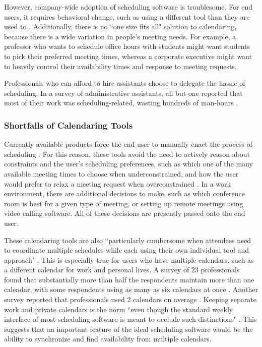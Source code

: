\documentclass{article}
\begin{document}
However, company-wide adoption of scheduling software is troublesome. For end users, it requires behavioral change, such as using a different tool than they are used to \cite{ehrlich_strategies_1987}. Additionally, there is no ``one size fits all" solution to calendaring, because there is a wide variation in people's meeting needs. For example, a professor who wants to schedule office hours with students might want students to pick their preferred meeting times, whereas a corporate executive might want to heavily control their availability times and response to meeting requests.

Professionals who can afford to hire assistants choose to delegate the hassle of scheduling. In a survey of administrative assistants, all but one reported that most of their work was scheduling-related, wasting hundreds of man-hours \cite{erickson_assistance:_2008}.

\subsubsection{Shortfalls of Calendaring Tools}

Currently available products force the end user to manually enact the process of scheduling \cite{jennings_agent-based_1995}. For this reason, these tools avoid the need to actively reason about constraints and the user's scheduling preferences, such as which one of the many available meeting times to choose when underconstrained, and how the user would prefer to relax a meeting request when overconstrained \cite{berry_ptime:_2011}. In a work environment, there are additional decisions to make, such as which conference room is best for a given type of meeting, or setting up remote meetings using video calling software. All of these decisions are presently passed onto the end user.

These calendaring tools are also ``particularly cumbersome when attendees need to coordinate multiple schedules while each using their own individual tool and approach" \cite{cranshaw_calendar.help:_2017}. This is especially true for users who have multiple calendars, such as a different calendar for work and personal lives. A survey of 23 professionals found that substantially more than half the respondents maintain more than one calendar, with some respondents using as many as six calendars at once \cite{kelley_how_1982}. Another survey reported that professionals used 2 calendars on average \cite{kincaid_electronic_1985}. Keeping separate work and private calendars is the norm ``even though the standard weekly interface of most scheduling software is meant to occlude such distinctions" \cite{wajcman_digital_2019}. This suggests that an important feature of the ideal scheduling software would be the ability to synchronize and find availability from multiple calendars.
\end{document}
